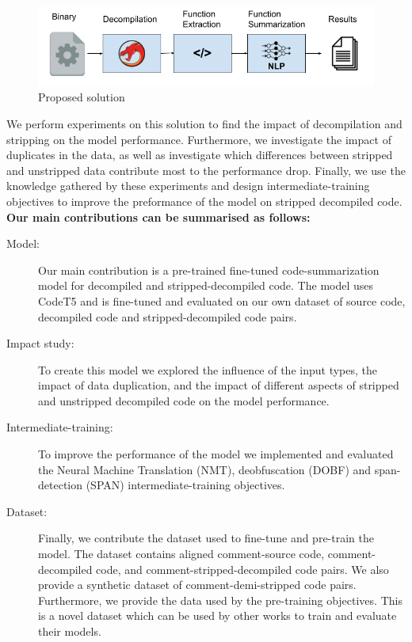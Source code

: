\label{fig:useCase}
\begin{figure}[htb]
    \centering
    \includegraphics[width=\textwidth,height=\textheight,keepaspectratio]{img/UseCase.png}
    \caption{Proposed solution}
\end{figure}

We perform experiments on this solution to find the impact of decompilation and stripping on the model performance. Furthermore, we investigate the impact of duplicates in the data, as well as investigate which differences between stripped and unstripped data contribute most to the performance drop. Finally, we use the knowledge gathered by these experiments and design intermediate-training objectives to improve the preformance of the model on stripped decompiled code.\\

\textbf{Our main contributions can be summarised as follows:}
\begin{description}
 \item[Model:] Our main contribution is a pre-trained fine-tuned code-summarization model for decompiled and stripped-decompiled code. The model uses CodeT5 and is fine-tuned and evaluated on our own dataset of source code, decompiled code and stripped-decompiled code pairs. 
 \item[Impact study:] To create this model we explored the influence of the input types, the impact of data duplication, and the impact of different aspects of stripped and unstripped decompiled code on the model performance.
 \item[Intermediate-training:] To improve the performance of the model we implemented and evaluated the Neural Machine Translation (NMT), deobfuscation (DOBF) and span-detection (SPAN) intermediate-training objectives. 
 \item[Dataset:] Finally, we contribute the dataset used to fine-tune and pre-train the model. The dataset contains aligned comment-source code, comment-decompiled code, and comment-stripped-decompiled code pairs. We also provide a synthetic dataset of comment-demi-stripped code pairs. Furthermore, we provide the data used by the pre-training objectives. This is a novel dataset which can be used by other works to train and evaluate their models.
\end{description}

